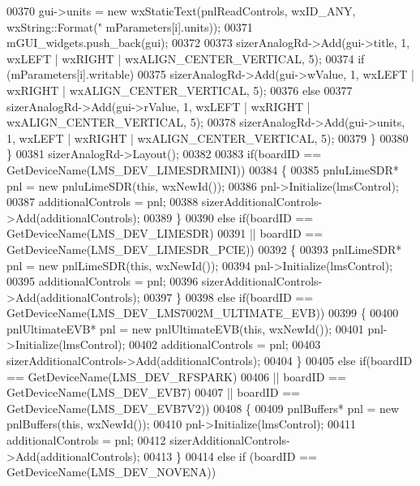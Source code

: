 \begin{DoxyCode}
{{{00370             gui->units = \textcolor{keyword}{new} wxStaticText(pnlReadControls, wxID\_ANY, wxString::Format(\textcolor{stringliteral}{"%
      mParameters[i].units));
00371             mGUI\_widgets.push\_back(gui);
00372 
00373             sizerAnalogRd->Add(gui->title, 1, wxLEFT | wxRIGHT | wxALIGN\_CENTER\_VERTICAL, 5);
00374             \textcolor{keywordflow}{if} (mParameters[i].writable)
00375                 sizerAnalogRd->Add(gui->wValue, 1, wxLEFT | wxRIGHT | wxALIGN\_CENTER\_VERTICAL, 5);
00376             \textcolor{keywordflow}{else}
00377                 sizerAnalogRd->Add(gui->rValue, 1, wxLEFT | wxRIGHT | wxALIGN\_CENTER\_VERTICAL, 5);
00378             sizerAnalogRd->Add(gui->units, 1, wxLEFT | wxRIGHT | wxALIGN\_CENTER\_VERTICAL, 5);
00379         \}
00380     \}
00381     sizerAnalogRd->Layout();
00382 
00383     \textcolor{keywordflow}{if}(boardID == GetDeviceName(LMS_DEV_LIMESDRMINI))
00384     \{
00385         pnluLimeSDR* pnl = \textcolor{keyword}{new} pnluLimeSDR(\textcolor{keyword}{this}, wxNewId());
00386         pnl->Initialize(lmsControl);
00387         additionalControls = pnl;
00388         sizerAdditionalControls->Add(additionalControls);
00389     \}
00390     \textcolor{keywordflow}{else} \textcolor{keywordflow}{if}(boardID == GetDeviceName(LMS_DEV_LIMESDR)
00391          || boardID == GetDeviceName(LMS_DEV_LIMESDR_PCIE))
00392     \{
00393         pnlLimeSDR* pnl = \textcolor{keyword}{new} pnlLimeSDR(\textcolor{keyword}{this}, wxNewId());
00394         pnl->Initialize(lmsControl);
00395         additionalControls = pnl;
00396         sizerAdditionalControls->Add(additionalControls);
00397     \}
00398     \textcolor{keywordflow}{else} \textcolor{keywordflow}{if}(boardID == GetDeviceName(LMS_DEV_LMS7002M_ULTIMATE_EVB))
00399     \{
00400         pnlUltimateEVB* pnl = \textcolor{keyword}{new} pnlUltimateEVB(\textcolor{keyword}{this}, wxNewId());
00401         pnl->Initialize(lmsControl);
00402         additionalControls = pnl;
00403         sizerAdditionalControls->Add(additionalControls);
00404     \}
00405     \textcolor{keywordflow}{else} \textcolor{keywordflow}{if}(boardID == GetDeviceName(LMS_DEV_RFSPARK)
00406          || boardID == GetDeviceName(LMS_DEV_EVB7)
00407          || boardID == GetDeviceName(LMS_DEV_EVB7V2))
00408     \{
00409         pnlBuffers* pnl = \textcolor{keyword}{new} pnlBuffers(\textcolor{keyword}{this}, wxNewId());
00410         pnl->Initialize(lmsControl);
00411         additionalControls = pnl;
00412         sizerAdditionalControls->Add(additionalControls);
00413     \}
00414     \textcolor{keywordflow}{else} \textcolor{keywordflow}{if} (boardID == GetDeviceName(LMS_DEV_NOVENA))
}}}}
\end{DoxyCode}
